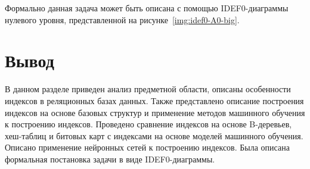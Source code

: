 Формально данная задача может быть описана с помощью IDEF0-диаграммы нулевого
уровня, представленной на рисунке~\ref{img:idef0-A0-big}.


\section*{Вывод}

В данном разделе приведен анализ предметной области, описаны особенности
индексов в реляционных базах данных. Также представлено описание построения
индексов на основе базовых структур и применение методов машинного обучения к
построению индексов. Проведено сравнение индексов на основе B-деревьев,
хеш-таблиц и битовых карт с индексами на основе моделей машинного обучения.
Описано применение нейронных сетей к построению индексов. Была описана
формальная постановка задачи в виде IDEF0-диаграммы.


